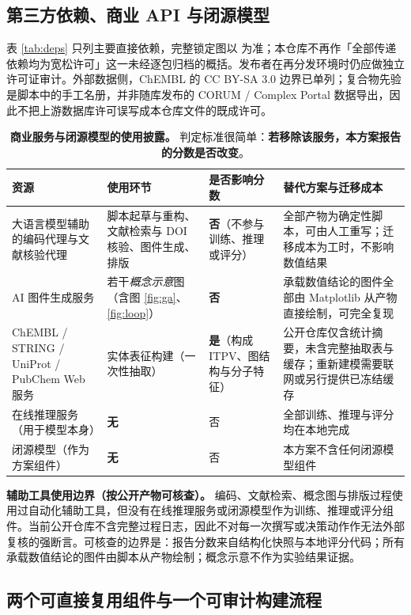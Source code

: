 \subsection{第三方依赖、商业 API 与闭源模型}

表 \ref{tab:deps} 只列主要直接依赖，完整锁定图以  为准；本仓库不再作「全部传递依赖均为宽松许可」这一未经逐包归档的概括。发布者在再分发环境时仍应做独立许可证审计。外部数据侧，ChEMBL 的 CC BY-SA 3.0 边界已单列；复合物先验是脚本中的手工名册，并非随库发布的 CORUM / Complex Portal 数据导出，因此不把上游数据库许可误写成本仓库文件的既成许可。

\begin{table}[H]
\centering\small
\caption{\textbf{商业服务与闭源模型的使用披露。} 判定标准很简单：\textbf{若移除该服务，本方案报告的分数是否改变}。}
\label{tab:disclosure}
\begin{tabularx}{\textwidth}{@{}R{3.3cm}R{4.0cm}R{2.1cm}X@{}}
\toprule
资源 & 使用环节 & 是否影响分数 & 替代方案与迁移成本 \\
\midrule
大语言模型辅助的编码代理与文献核验代理 & 脚本起草与重构、文献检索与 DOI 核验、图件生成、排版 & \textbf{否}（不参与训练、推理或评分） & 全部产物为确定性脚本，可由人工重写；迁移成本为工时，不影响数值结果 \\
AI 图件生成服务 & 若干\emph{概念示意}图（含图 \ref{fig:ga}、\ref{fig:loop}） & \textbf{否} & 承载数值结论的图件全部由 Matplotlib 从产物直接绘制，可完全复现 \\
ChEMBL / STRING / UniProt / PubChem Web 服务 & 实体表征构建（一次性抽取） & \textbf{是}（构成 ITPV、图结构与分子特征） & 公开仓库仅含统计摘要，未含完整抽取表与缓存；重新建模需要联网或另行提供已冻结缓存 \\
在线推理服务（用于模型本身） & \textbf{无} & 否 & 全部训练、推理与评分均在本地完成 \\
闭源模型（作为方案组件） & \textbf{无} & 否 & 本方案不含任何闭源模型组件 \\
\bottomrule
\end{tabularx}
\end{table}

\textbf{辅助工具使用边界（按公开产物可核查）。} 编码、文献检索、概念图与排版过程使用过自动化辅助工具，但没有在线推理服务或闭源模型作为训练、推理或评分组件。当前公开仓库不含完整过程日志，因此不对每一次撰写或决策动作作无法外部复核的强断言。可核查的边界是：报告分数来自结构化快照与本地评分代码；所有承载数值结论的图件由脚本从产物绘制；概念示意不作为实验结果证据。

\subsection{两个可直接复用组件与一个可审计构建流程}

